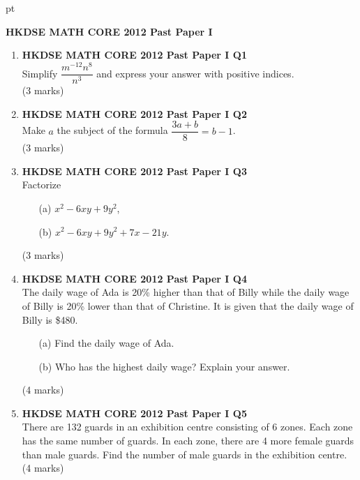 \documentclass[12pt]{article}
\begin{document}
 pt
\begin{center}
	{\large \bf HKDSE MATH CORE 2012 Past Paper I}\\
	\vspace{2 mm}

\end{center}
\vspace{0.05cm}

\begin{enumerate}
	\item \textbf{HKDSE MATH CORE 2012 Past Paper I Q1}\\
	Simplify $\dfrac{m^{-12}n^8}{n^3}$ and express your answer with positive indices. \\(3 marks)	
	
	\item \textbf{HKDSE MATH CORE 2012 Past Paper I Q2}\\
	Make $a$ the subject of the formula $\dfrac{3a+b}{8} = b-1$. \\(3 marks)

	\item \textbf{HKDSE MATH CORE 2012 Past Paper I Q3}\\
	Factorize
	\begin{enumerate}
		\item [(a)] $x^2 - 6xy + 9y^2$,
		\item [(b)] $x^2 - 6xy + 9y^2 + 7x - 21y$.
	\end{enumerate}
	(3 marks)

	\item \textbf{HKDSE MATH CORE 2012 Past Paper I Q4}\\
	The daily wage of Ada is 20\% higher than that of Billy while the daily wage of Billy is 20\% lower than that of Christine. It is given that the daily wage of Billy is \$480.
	\begin{enumerate}
		\item [(a)] Find the daily wage of Ada.
		\item [(b)] Who has the highest daily wage? Explain your answer.
	\end{enumerate}	
	(4 marks)
	
	\item \textbf{HKDSE MATH CORE 2012 Past Paper I Q5}\\
	There are 132 guards in an exhibition centre consisting of 6 zones. Each zone has the same number of guards. In each zone, there are 4 more female guards than male guards. Find the number of male guards in the exhibition centre. \\(4 marks)
	

\end{enumerate}
\end{document}
